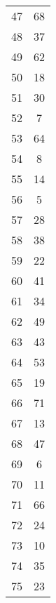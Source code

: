 \begin{table}
\begin{tabular}{c c }
47 & 68 \\
48 & 37 \\
49 & 62 \\
50 & 18 \\
51 & 30 \\
52 & 7 \\
53 & 64 \\
54 & 8 \\
55 & 14 \\
56 & 5 \\
57 & 28 \\
58 & 38 \\
59 & 22 \\
60 & 41 \\
61 & 34 \\
62 & 49 \\
63 & 43 \\
64 & 53 \\
65 & 19 \\
66 & 71 \\
67 & 13 \\
68 & 47 \\
69 & 6 \\
70 & 11 \\
71 & 66 \\
72 & 24 \\
73 & 10 \\
74 & 35 \\
75 & 23 \\
\hline
\end{tabular}
\end{table}